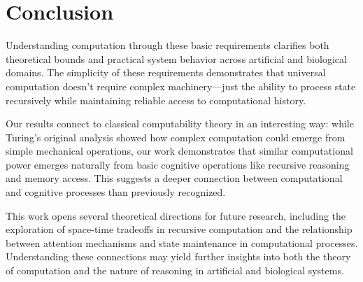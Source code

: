 \documentclass[12pt]{article}
\begin{document}
\section{Conclusion}

Understanding computation through these basic requirements clarifies both theoretical bounds and practical system behavior across artificial and biological domains. The simplicity of these requirements demonstrates that universal computation doesn't require complex machinery---just the ability to process state recursively while maintaining reliable access to computational history.

Our results connect to classical computability theory in an interesting way: while Turing's original analysis showed how complex computation could emerge from simple mechanical operations, our work demonstrates that similar computational power emerges naturally from basic cognitive operations like recursive reasoning and memory access. This suggests a deeper connection between computational and cognitive processes than previously recognized.

This work opens several theoretical directions for future research, including the exploration of space-time tradeoffs in recursive computation and the relationship between attention mechanisms and state maintenance in computational processes. Understanding these connections may yield further insights into both the theory of computation and the nature of reasoning in artificial and biological systems.



\end{document}
